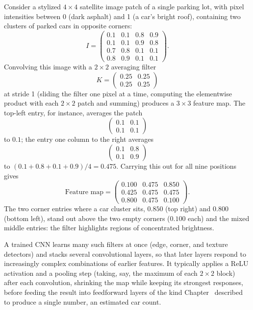 \documentclass[../ai_in_finance]{subfiles}
\begin{document}
Consider a stylized $4\times4$ satellite image patch of a single parking lot, with pixel intensities between 0 (dark asphalt) and 1 (a car's bright roof), containing two clusters of parked cars in opposite corners:
\begin{equation*}
I = \begin{pmatrix} 0.1 & 0.1 & 0.8 & 0.9 \\ 0.1 & 0.1 & 0.9 & 0.8 \\ 0.7 & 0.8 & 0.1 & 0.1 \\ 0.8 & 0.9 & 0.1 & 0.1 \end{pmatrix}.
\end{equation*}
Convolving this image with a $2\times2$ averaging filter
$$K = \begin{pmatrix}0.25 & 0.25\\ 0.25 & 0.25\end{pmatrix}$$
at stride 1 (sliding the filter one pixel at a time, computing the elementwise product with each $2\times2$ patch and summing) produces a $3\times3$ feature map. The top-left entry, for instance, averages the patch
$$\begin{pmatrix}0.1&0.1\\0.1&0.1\end{pmatrix}$$
to $0.1$; the entry one column to the right averages
$$\begin{pmatrix}0.1&0.8\\0.1&0.9\end{pmatrix}$$
to $(0.1+0.8+0.1+0.9)/4 = 0.475$. Carrying this out for all nine positions gives
\begin{equation*}
\text{Feature map} = \begin{pmatrix} 0.100 & 0.475 & 0.850 \\ 0.425 & 0.475 & 0.475 \\ 0.800 & 0.475 & 0.100 \end{pmatrix}.
\end{equation*}
The two corner entries where a car cluster sits, $0.850$ (top right) and $0.800$ (bottom left), stand out above the two empty corners ($0.100$ each) and the mixed middle entries: the filter highlights regions of concentrated brightness.

A trained CNN learns many such filters at once (edge, corner, and texture detectors) and stacks several convolutional layers, so that later layers respond to increasingly complex combinations of earlier features. It typically applies a ReLU activation and a pooling step (taking, say, the maximum of each $2\times2$ block) after each convolution, shrinking the map while keeping its strongest responses, before feeding the result into feedforward layers of the kind Chapter~ described to produce a single number, an estimated car count.
\end{document}
